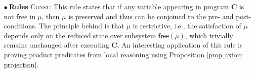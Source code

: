 \documentclass[conference,compsoc, 10pt]{IEEEtran}
\newcommand {\free }[1] {{\mathsf{free}\left(#1\right)}}
\newcommand {\var } {\mathsf{var}}
\newcommand {\prog } {{\mathbf{C}}}
\newcommand{\sd}{\diamond}%
\providecommand{\todo}[1]{{\protect\color{red}\noindent {\bf [todo]}\emph{#1} {\bf [/todo]}}}
\begin{document}
	
	
	
	
	\vspace{0.2cm}
	
	\noindent$\bullet\ $\textbf{Rules} \textsc{Const}: This rule states that if any
      variable appearing in program $\prog$ is not free in $\mu$, then $\mu$ is preserved and thus can be conjoined to the pre- and post-conditions. 
		The principle behind is that $\mu$ is restrictive, i.e., the satisfaction of $\mu$ depends only on the reduced state over subsystem $\free{\mu}$, which trivially remains unchanged after executing $\prog$. 
		An interesting application of this rule is proving  product predicates from local reasoning using Proposition \ref{prop axiom projection}.
	
	\vspace{0.2cm}
	
\end{document}
